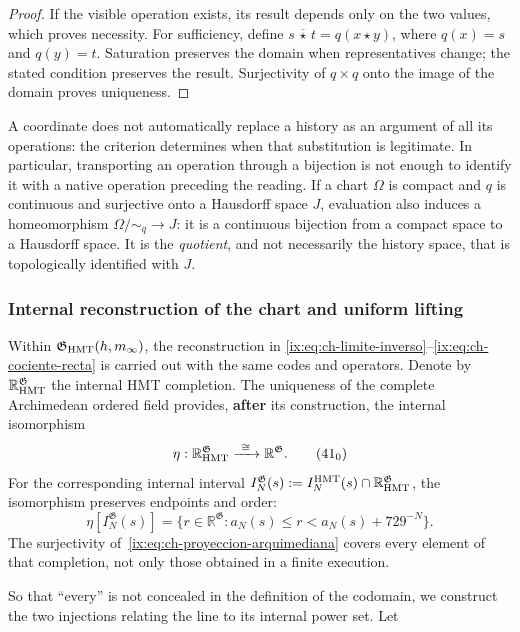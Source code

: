 \begin{proof}
If the visible operation exists, its result depends only on the two
values, which proves necessity. For sufficiency, define
\(s\,\overline\star\,t=q(x\star y)\), where \(q(x)=s\) and
\(q(y)=t\). Saturation preserves the domain when representatives change;
the stated condition preserves the result. Surjectivity of
\(q\times q\) onto the image of the domain proves uniqueness.
\end{proof}

A coordinate does not automatically replace a history as an argument of
all its operations: the criterion determines when that substitution is
legitimate. In particular, transporting an operation through a bijection
is not enough to identify it with a native operation preceding the reading.
If a chart \(\Omega\) is compact and \(q\) is continuous and surjective
onto a Hausdorff space \(J\), evaluation also induces a
homeomorphism \(\Omega/{\sim_q}\to J\): it is a continuous bijection from a
compact space to a Hausdorff space. It is the \emph{quotient}, and not necessarily the
history space, that is topologically identified with \(J\).



\subsubsection{Internal reconstruction of the chart and uniform lifting}

Within \(\mathfrak G_{\rm HMT}(h,m_\infty)\), the reconstruction in
\eqref{ix:eq:ch-limite-inverso}--\eqref{ix:eq:ch-cociente-recta} is carried out with
the same codes and operators. Denote by
\(\mathbb R_{\rm HMT}^{\mathfrak G}\) the internal HMT completion. The
uniqueness of the complete Archimedean ordered field provides, \textbf{after}
its construction, the internal isomorphism
\[
 \eta:\mathbb R_{\rm HMT}^{\mathfrak G}
 \xrightarrow{\ \cong\ }\mathbb R^{\mathfrak G}.
\tag{41$_0$}\label{ix:eq:ch-isomorfismo-interno}
\]
For the corresponding internal interval
\(I_N^{\mathfrak G}(s):=
 I_N^{\rm HMT}(s)\cap\mathbb R_{\rm HMT}^{\mathfrak G}\), the isomorphism
preserves endpoints and order:
\[
 \eta[I_N^{\mathfrak G}(s)]
 =\{r\in\mathbb R^{\mathfrak G}:
      a_N(s)\le r<a_N(s)+729^{-N}\}.
\tag{41$_0$a}\label{ix:eq:ch-intervalos-internos}
\]
The surjectivity of~\eqref{ix:eq:ch-proyeccion-arquimediana} covers every element
of that completion, not only those obtained in a finite execution.

So that “every” is not concealed in the definition of the codomain, we
construct the two injections relating the line to its internal power set. Let

